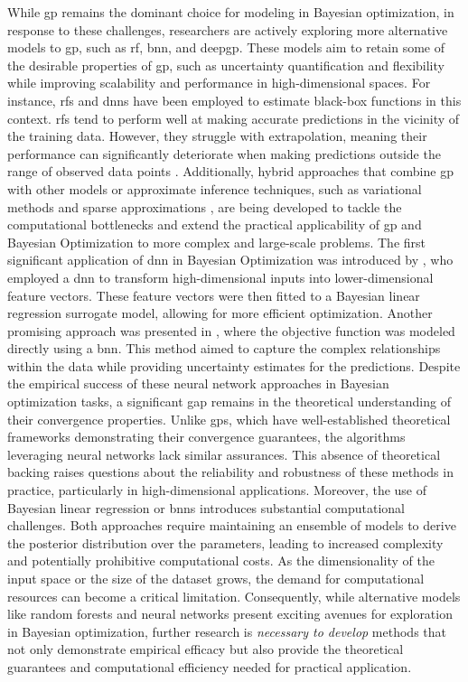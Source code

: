 While \ac{gp} remains the dominant choice for modeling in Bayesian optimization, in response to these challenges,  researchers are actively exploring more alternative models to \ac{gp}, such as \ac{rf}, \ac{bnn}, and \ac{deepgp}. These models aim to retain some of the desirable properties of \ac{gp}, such as uncertainty quantification and flexibility while improving scalability and performance in high-dimensional spaces. For instance, \acfp{rf} and \acp{dnn} have been employed to estimate black-box functions in this context. \acp{rf} tend to perform well at making accurate predictions in the vicinity of the training data. However, they struggle with extrapolation, meaning their performance can significantly deteriorate when making predictions outside the range of observed data points \citep{shahriari2015taking}. Additionally, hybrid approaches that combine \ac{gp} with other models or approximate inference techniques, such as variational methods \citep{tran2016variational} and sparse approximations \citep{snelson2007local}, are being developed to tackle the computational bottlenecks and extend the practical applicability of \ac{gp} and Bayesian Optimization to more complex and large-scale problems.  The first significant application of \ac{dnn} in Bayesian Optimization was introduced by \citet{snoek2015scalable}, who employed a \ac{dnn} to transform high-dimensional inputs into lower-dimensional feature vectors. These feature vectors were then fitted to a Bayesian linear regression surrogate model, allowing for more efficient optimization. Another promising approach was presented in \citet{springenberg2016bayesian}, where the objective function was modeled directly using a \acf{bnn}. This method aimed to capture the complex relationships within the data while providing uncertainty estimates for the predictions. Despite the empirical success of these neural network approaches in Bayesian optimization tasks, a significant gap remains in the theoretical understanding of their convergence properties. Unlike \acp{gp}, which have well-established theoretical frameworks demonstrating their convergence guarantees, the algorithms leveraging neural networks lack similar assurances. This absence of theoretical backing raises questions about the reliability and robustness of these methods in practice, particularly in high-dimensional applications. Moreover, the use of Bayesian linear regression or \acp{bnn} introduces substantial computational challenges. Both approaches require maintaining an ensemble of models to derive the posterior distribution over the parameters, leading to increased complexity and potentially prohibitive computational costs. As the dimensionality of the input space or the size of the dataset grows, the demand for computational resources can become a critical limitation. Consequently, while alternative models like random forests and neural networks present exciting avenues for exploration in Bayesian optimization, further research is \textit{necessary to develop} methods that not only demonstrate empirical efficacy but also provide the theoretical guarantees and computational efficiency needed for practical application.

